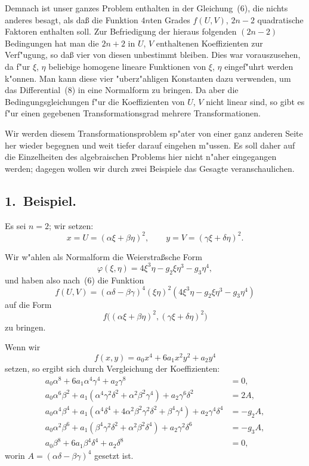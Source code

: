 \documentclass[12pt,a4paper]{article}
\theoremstyle{definition}
\begin{document}
\newpage

Demnach ist unser ganzes Problem enthalten in der Gleichung~(6), die nichts anderes besagt, als da\ss{}{} die Funktion $4n$ten Grades $f(U,V)$, $2n-2$ quadratische Faktoren enthalten soll. Zur Befriedigung der hieraus folgenden $(2n-2)$ Bedingungen hat man die $2n+2$ in $U$, $V$ enthaltenen Koeffizienten zur Verf"ugung, so da\ss{}{} vier von diesen unbestimmt bleiben. Dies war vorauszusehen, da f"ur $\xi$, $\eta$ beliebige homogene lineare Funktionen von $\xi$, $\eta$ eingef"uhrt werden k"onnen. Man kann diese vier "uberz"ahligen Konstanten dazu verwenden, um das Differential~(8) in eine Normalform zu bringen. Da aber die Bedingungsgleichungen f"ur die Koeffizienten von $U$, $V$ nicht linear sind, so gibt es f"ur einen gegebenen Transformationsgrad mehrere Transformationen.

Wir werden diesem Transformationsproblem sp"ater von einer ganz anderen Seite her wieder begegnen und weit tiefer darauf eingehen m"ussen. Es soll daher auf die Einzelheiten des algebraischen Problems hier nicht n"aher eingegangen werden; dagegen wollen wir durch zwei Beispiele das Gesagte veranschaulichen.

\subsection*{1.~Beispiel.} Es sei $n = 2$; wir setzen:
\begin{equation}\tag{9}
x = U = (\alpha\xi + \beta\eta)^2,\qquad y = V = (\gamma\xi + \delta\eta)^2.
\end{equation}

Wir w"ahlen als Normalform die Weierstra\ss{}sche Form
\[\varphi(\xi,\eta) = 4\xi^3\eta - g_2\xi\eta^3 - g_3\eta^4,
\]
und haben also nach~(6) die Funktion
\[f(U,V) = (\alpha\delta - \beta\gamma)^4(\xi\eta)^2(4\xi^3\eta - g_2\xi\eta^3 - g_3\eta^4)
\]
auf die Form
\[f\bigl((\alpha\xi + \beta\eta)^2, (\gamma\xi + \delta\eta)^2\bigr)
\]
zu bringen.

Wenn wir
\begin{equation}\tag{10}
f(x,y) = a_0x^4 + 6a_1x^2y^2 + a_2y^4
\end{equation}
setzen, so ergibt sich durch Vergleichung der Koeffizienten:
\begin{align*}
a_0\alpha^8 + 6a_1\alpha^4\gamma^4 + a_2\gamma^8 &= 0,\\
a_0\alpha^6\beta^2 + a_1(\alpha^4\gamma^2\delta^2 + \alpha^2\beta^2\gamma^4) + a_2\gamma^6\delta^2 &= 2A,\\
a_0\alpha^4\beta^4 + a_1(\alpha^4\delta^4 + 4\alpha^2\beta^2\gamma^2\delta^2 + \beta^4\gamma^4) + a_2\gamma^4\delta^4 &= -g_2A,\\
a_0\alpha^2\beta^6 + a_1(\beta^4\gamma^2\delta^2 + \alpha^2\beta^2\delta^4) + a_2\gamma^2\delta^6 &= -g_3A,\\
a_0\beta^8 + 6a_1\beta^4\delta^4 + a_2\delta^8 &= 0,
\end{align*}
worin $A = (\alpha\delta - \beta\gamma)^4$ gesetzt ist.
\end{document}
